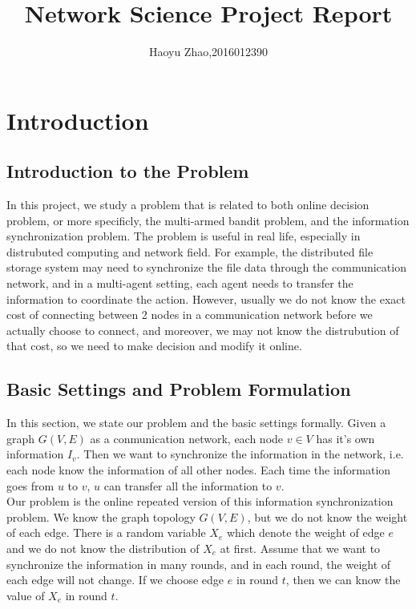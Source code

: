 \documentclass{article}
\title{\bf\huge Network Science Project Report}
\author{Haoyu Zhao,2016012390}
\date{}
\theoremstyle{plain}
\theoremstyle{definition}
\theoremstyle{remark}
\begin{document}
    \maketitle

    \section{Introduction}
    \subsection{Introduction to the Problem}
    In this project, we study a problem that is related to both online decision problem, or more specificly, the multi-armed bandit problem, and the information synchronization problem. The problem is useful in real life, especially in distrubuted computing and network field. For example, the distributed file storage system may need to synchronize the file data through the communication network, and in a multi-agent setting, each agent needs to transfer the information to coordinate the action. However, usually we do not know the exact cost of connecting between 2 nodes in a communication network before we actually choose to connect, and moreover, we may not know the distrubution of that cost, so we need to make decision and modify it online.

    \subsection{Basic Settings and Problem Formulation}
    In this section, we state our problem and the basic settings formally. Given a graph $G(V,E)$ as a conmunication network, each node $v\in V$ has it's own information $I_v$. Then we want to synchronize the information in the network, i.e. each node know the information of all other nodes. Each time the information goes from $u$ to $v$, $u$ can transfer all the information to $v$.\\

    Our problem is the online repeated version of this information synchronization problem. We know the graph topology $G(V,E)$, but we do not know the weight of each edge. There is a random variable $X_e$ which denote the weight of edge $e$ and we do not know the distribution of $X_e$ at first. Assume that we want to synchronize the information in many rounds, and in each round, the weight of each edge will not change. If we choose edge $e$ in round $t$, then we can know the value of $X_e$ in round $t$.\\
\end{document}

